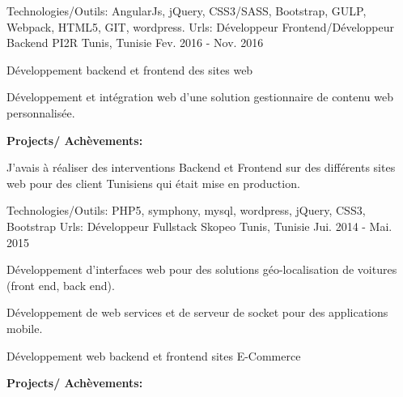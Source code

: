 \begin{cventries}
{\begin{cvitems}
      \end{cvitems}
    }
    {\textcolor{awesome}{Technologies/Outils: } {\color{graytext}}  {AngularJs, jQuery, CSS3/SASS, Bootstrap, GULP, Webpack, HTML5, GIT, wordpress.}}
    {Urls:} 
    { \href{http://anahita.mu/}{ \break
    }}
  \techentries
    {Développeur Frontend/Développeur Backend}
    {PI2R}
    {Tunis, Tunisie}
    {Fev. 2016 - Nov. 2016}
    {
      \begin{cvitems}
        \item {Développement backend et frontend des sites web }
        \item {Développement et intégration web d'une solution gestionnaire de contenu web personnalisée. }
      \end{cvitems}
\vspace{10pt}\textbf{Projects/ Achèvements:}
      \begin{cvitems}
	{\vspace{14pt}}
        \item {J'avais à réaliser des interventions Backend et Frontend sur des différents sites web pour des client Tunisiens qui était mise en production. }
      \end{cvitems}
    }
    {\textcolor{awesome}{Technologies/Outils: } {\color{graytext}}  {PHP5, symphony, mysql, wordpress, jQuery, CSS3, Bootstrap}}
    {Urls:} 
    {
    \href{http://www.milddream.com/fr/ }{} \break
    \href{http://www.ozeol.com/fr/}{} \break
    }    
  \techentries
    {Développeur Fullstack}
    {Skopeo}
    {Tunis, Tunisie}
    {Jui. 2014 - Mai. 2015}
    {
      \begin{cvitems}
        \item {Développement d'interfaces web pour des solutions géo-localisation de voitures (front end, back end).}
        \item {Développement de web services et de serveur de socket pour des applications mobile.}
        \item {Développement web backend et frontend sites E-Commerce}
      \end{cvitems}
\vspace{10pt}\textbf{Projects/ Achèvements:}
      \begin{cvitems}

\end{cvitems}}
\end{cventries}
